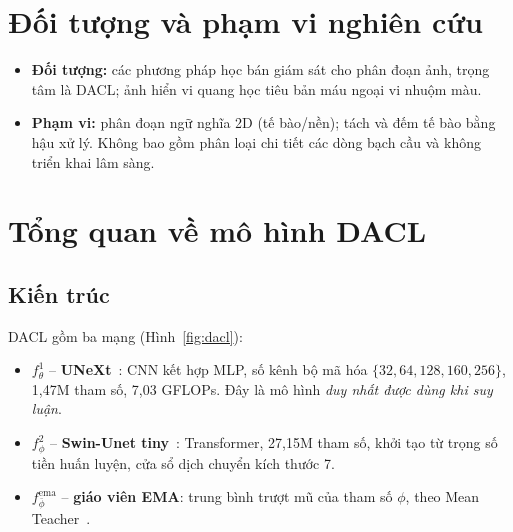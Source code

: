 \documentclass[12pt,a4paper]{article}
\begin{document}
\section{Đối tượng và phạm vi nghiên cứu}

\begin{itemize}
  \item \textbf{Đối tượng:} các phương pháp học bán giám sát cho phân đoạn ảnh, trọng tâm
        là DACL; ảnh hiển vi quang học tiêu bản máu ngoại vi nhuộm màu.
  \item \textbf{Phạm vi:} phân đoạn ngữ nghĩa 2D (tế bào/nền); tách và đếm tế bào bằng hậu
        xử lý. Không bao gồm phân loại chi tiết các dòng bạch cầu và không triển khai lâm sàng.
\end{itemize}

\section{Tổng quan về mô hình DACL}

\subsection{Kiến trúc}
DACL gồm ba mạng (Hình~\ref{fig:dacl}):
\begin{itemize}
  \item $f^1_\theta$ -- \textbf{UNeXt}~\cite{valanarasu2022unext}: CNN kết hợp MLP, số kênh
        bộ mã hóa $\{32,64,128,160,256\}$, 1{,}47M tham số, 7{,}03 GFLOPs. Đây là mô hình
        \emph{duy nhất được dùng khi suy luận}.
  \item $f^2_\phi$ -- \textbf{Swin-Unet tiny}~\cite{cao2022swinunet}: Transformer, 27{,}15M
        tham số, khởi tạo từ trọng số tiền huấn luyện, cửa sổ dịch chuyển kích thước 7.
  \item $f^{\mathrm{ema}}_{\bar\phi}$ -- \textbf{giáo viên EMA}: trung bình trượt mũ của
        tham số $\phi$, theo Mean Teacher~\cite{tarvainen2017mt}.
\end{itemize}
\end{document}
